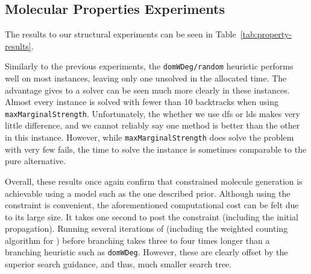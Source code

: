 \documentclass[../Document.tex]{subfiles}
\begin{document}
\subsection{Molecular Properties Experiments}
The results to our structural experiments can be seen in Table~\ref{tab:property-results}.

Similarly to the previous experiments, the \texttt{domWDeg/random} heuristic performs well on most instances, leaving only one unsolved in the allocated time.
The advantage \bp gives to a solver can be seen much more clearly in these instances.
Almost every instance is solved with fewer than 10 backtracks when using \texttt{maxMarginalStrength}.
Unfortunately, the whether we use \gls{dfs} or \gls{lds} makes very little difference, and we cannot reliably say one method is better than the other in this instance.
However, while \texttt{maxMarginalStrength} does solve the problem with very few fails, the time to solve the instance is sometimes comparable to the pure \cp alternative.

Overall, these results once again confirm that constrained molecule generation is achievable using a \cp model such as the one described prior.
Although using the \grammar constraint is convenient, the aforementioned computational cost can be felt due to its large size.
It takes one second to post the constraint (including the initial propagation).
Running several iterations of \bp (including the weighted counting algorithm for \grammar) before branching takes three to four times longer than a branching heuristic such as \texttt{domWDeg}.
However, these are clearly offset by the superior search guidance, and thus, much smaller search tree.
\end{document}
